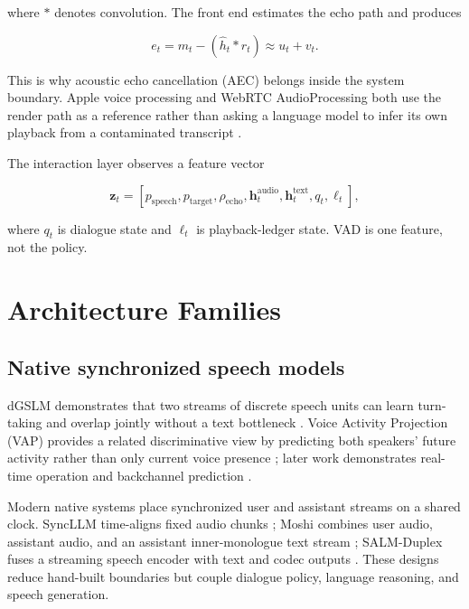 \documentclass[11pt]{article}
\newcommand{\vect}[1]{\boldsymbol{#1}}
\begin{document}
where $*$ denotes convolution. The front end estimates the echo path and
produces

\begin{equation}
  e_t = m_t - (\hat h_t * r_t) \approx u_t + v_t.
  \label{eq:aec}
\end{equation}

This is why acoustic echo cancellation (AEC) belongs inside the system
boundary. Apple voice processing and WebRTC AudioProcessing both use the
render path as a reference rather than asking a language model to infer its own
playback from a contaminated transcript
\citep{apple2026voiceprocessing,webrtc2026apm}.

The interaction layer observes a feature vector

\begin{equation}
\vect z_t = [p_{\mathrm{speech}}, p_{\mathrm{target}},
\rho_{\mathrm{echo}}, \vect h^{\mathrm{audio}}_t,
\vect h^{\mathrm{text}}_t, q_t, \ell_t],
\label{eq:evidence}
\end{equation}

where $q_t$ is dialogue state and $\ell_t$ is playback-ledger state. VAD is one
feature, not the policy.

\section{Architecture Families}

\subsection{Native synchronized speech models}

dGSLM demonstrates that two streams of discrete speech units can learn
turn-taking and overlap jointly without a text bottleneck
\citep{nguyen2022dgslm}. Voice Activity Projection (VAP) provides a related
discriminative view by predicting both speakers' future activity rather than
only current voice presence \citep{ekstedt2022vap}; later work demonstrates
real-time operation and backchannel prediction
\citep{inoue2024realtimevap,inoue2024backchannel}.

Modern native systems place synchronized user and assistant streams on a
shared clock. SyncLLM time-aligns fixed audio chunks
\citep{veluri2024syncllm}; Moshi combines user audio, assistant audio, and an
assistant inner-monologue text stream \citep{defossez2024moshi}; SALM-Duplex
fuses a streaming speech encoder with text and codec outputs
\citep{hu2025salm}. These designs reduce hand-built boundaries but couple
dialogue policy, language reasoning, and speech generation.
\end{document}
